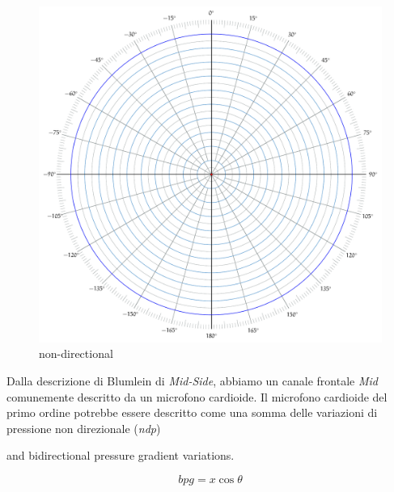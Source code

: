 \begin{figure}[h]
\centering
\includegraphics[width=1\columnwidth]{CAPITOLI/_TIKZ/POLAR/omni}
\caption{non-directional}
\label{polar:omni}
\end{figure}


Dalla descrizione di Blumlein di \emph{Mid-Side}, abbiamo un canale frontale
\emph{Mid} comunemente descritto da un microfono cardioide. Il microfono
cardioide del primo ordine potrebbe essere descritto come una somma delle
variazioni di pressione non direzionale (\emph{ndp})

and bidirectional pressure gradient variations.

\begin{equation}
bpg = x\cos\theta
\label{eq:fig8}
\end{equation}

